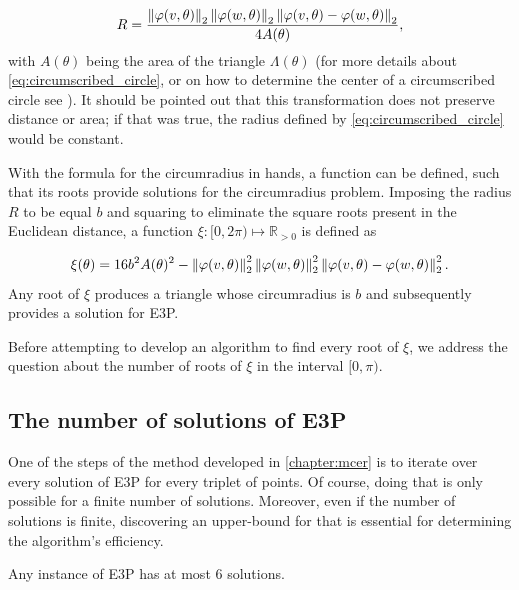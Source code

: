 \begin{equation}\label{eq:circumscribed_circle}
R = \dfrac{\left\lVert\varphi(v, \theta)\right\rVert_{2}\left\lVert\varphi(w, \theta)\right\rVert_{2}\left\lVert\varphi(v, \theta)-\varphi(w, \theta)\right\rVert_{2}   }{4A(\theta)},
\end{equation}
with $A(\theta)$ being the area of the triangle $\Lambda(\theta)$ (for more details about \autoref{eq:circumscribed_circle}, or on how to determine the center of a circumscribed circle see 
). It should be pointed out that this transformation does not preserve distance or area; if that was true, the radius defined by \autoref{eq:circumscribed_circle} would be constant.

With the formula for the circumradius in hands, a function can be defined, such that its roots provide solutions for the circumradius problem.
Imposing the radius $R$ to be equal $b$ and squaring to eliminate the square roots present in the Euclidean distance, a function $\xi : [0, 2\pi) \mapsto \mathbb{R}_{>0}$ is defined as 

\begin{equation}\label{eq:circumscribed_circle_b}
\xi(\theta) = 16b^2A(\theta)^2 - \left\lVert\varphi(v, \theta)\right\rVert_{2}^2\left\lVert\varphi(w, \theta)\right\rVert_{2}^2\left\lVert\varphi(v, \theta)-\varphi(w, \theta)\right\rVert_{2}^2.
\end{equation}
Any root of $\xi$ produces a triangle whose circumradius is $b$ and subsequently provides a solution for E3P.

Before attempting to develop an algorithm to find every root of $\xi$, we address the question about the number of roots of $\xi$ in the interval $[0, \pi)$.

\subsection{The number of solutions of E3P}

One of the steps of the method developed in \autoref{chapter:mcer} is to iterate over every solution of E3P for every triplet of points. Of course, doing that is only possible for a finite number of solutions. Moreover, even if the number of solutions is finite, discovering an upper-bound for that is essential for determining the algorithm's efficiency.

\begin{lema}\label{lema:e3p}
	Any instance of E3P has at most $6$ solutions.
\end{lema}


